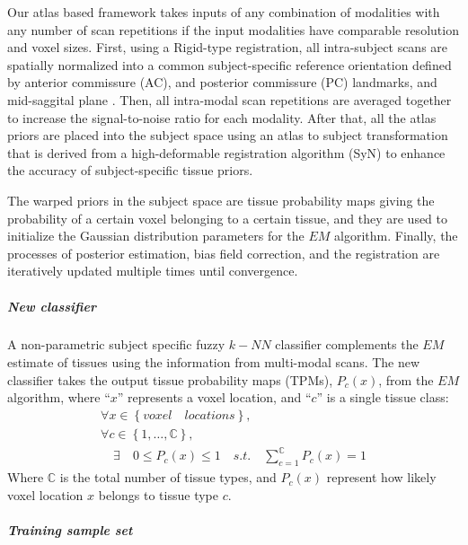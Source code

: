 Our atlas based framework takes inputs of any combination of modalities with any number of scan repetitions if the input modalities have comparable resolution and voxel sizes.
First, using a Rigid-type registration, all intra-subject scans are spatially normalized into a common subject-specific reference orientation defined by anterior commissure (AC), and posterior commissure (PC) landmarks, and mid-saggital plane \cite{Ghayoor13}.
Then, all intra-modal scan repetitions are averaged together to increase the signal-to-noise ratio for each modality.
After that, all the atlas priors are placed into the subject space using an atlas to subject transformation that is derived from a high-deformable registration algorithm (SyN) \cite{Avants2008b,avants2009advanced} to enhance the accuracy of subject-specific tissue priors.

The warped priors in the subject space are tissue probability maps giving the probability of a certain voxel belonging to a certain tissue, and they are used to initialize the Gaussian distribution parameters for the $EM$ algorithm. Finally, the processes of posterior estimation, bias field correction, and the registration are iteratively updated multiple times until convergence.

\subparagraph{New classifier} %

A non-parametric subject specific fuzzy $k-NN$ classifier complements the $EM$ estimate of tissues using the information from multi-modal scans. The new classifier takes the output tissue probability maps (TPMs), $P_{c}(x)$, from the $EM$ algorithm, where ``$x$'' represents a voxel location, and ``$c$'' is a single tissue class:
\begin{equation}
\begin{gathered}
\forall x\in \left\{voxel \quad locations\right\}, \\
\forall c\in \left\{1,\ldots, \mathbb{C}\right\}, \\
\quad \exists \quad 0 \leq P_c(x) \leq 1 \quad s.t. \quad
\sum^{\mathbb{C}}_{c=1}P_c(x)=1
\end{gathered}
\end{equation}
Where $\mathbb{C}$ is the total number of tissue types, and $P_{c}(x)$ represent how likely voxel location $x$ belongs to tissue type $c$.

\subparagraph*{Training sample set} %

